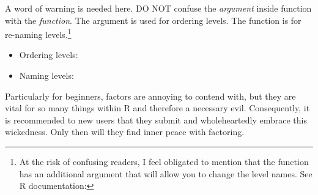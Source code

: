 A word of warning is needed here. DO NOT confuse the  \textit{argument} inside  function with the  \textit{function}. The  argument is used for ordering levels. The  function is for re-naming levels.\footnote{At the risk of confusing readers, I feel obligated to mention that the  function has an additional argument  that will allow you to change the level names. See R documentation: }

{
\begin{itemize}
    \item Ordering levels: 
    \item Naming levels: 
\end{itemize}
}

Particularly for beginners, factors are annoying to contend with, but they are vital for so many things within R and therefore a necessary evil. Consequently, it is recommended to new users that they submit and wholeheartedly embrace this wickedness. Only then will they find inner peace with factoring.
